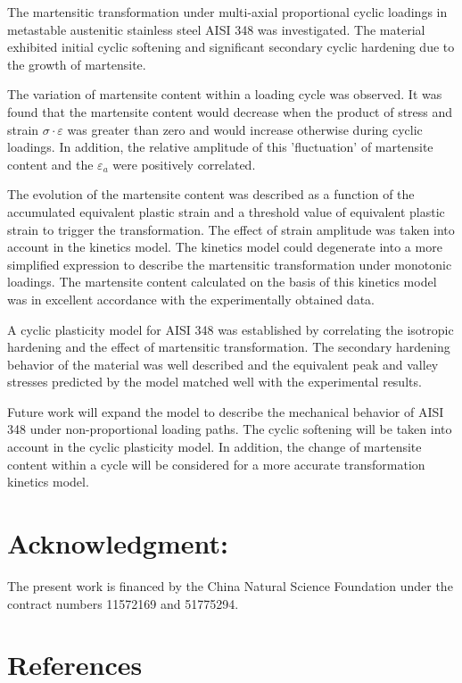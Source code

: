 \documentclass[preprint,5p,twocolumn,10pt,sort&compress]{elsarticle}
\begin{document}
The martensitic transformation under multi-axial proportional cyclic loadings in metastable austenitic stainless steel AISI 348 was investigated. The material exhibited initial cyclic softening and significant secondary cyclic hardening due to the growth of martensite.

The variation of martensite content within a loading cycle was observed.  It was found that the martensite content would decrease when the product of stress and strain $\sigma \cdot \varepsilon$ was greater than zero and would increase otherwise during cyclic loadings. In addition, the relative amplitude of this 'fluctuation' of martensite content and the $\varepsilon _{a}$ were positively correlated.

The evolution of the martensite content was described as a function of the accumulated equivalent plastic strain and a threshold value of equivalent plastic strain to trigger the transformation. The effect of strain amplitude was taken into account in the kinetics model. The kinetics model could degenerate into a more simplified expression to describe the martensitic transformation under monotonic loadings. The martensite content calculated on the basis of this kinetics model was in excellent accordance with the experimentally obtained data.

A cyclic plasticity model for AISI 348 was established by correlating the isotropic hardening and the effect of martensitic transformation. The secondary hardening behavior of the material was well described and the equivalent peak and valley stresses predicted by the model matched well with the experimental results.

Future work will expand the model to describe the mechanical behavior of AISI 348 under non-proportional loading paths. The cyclic softening will be taken into account in the cyclic plasticity model. In addition, the change of martensite content within a cycle will be considered for a more accurate transformation kinetics model.


\section*{Acknowledgment:} The present work is financed by the China Natural Science Foundation under the contract numbers 11572169 and 51775294.

\section*{References}

%
%


\end{document}

